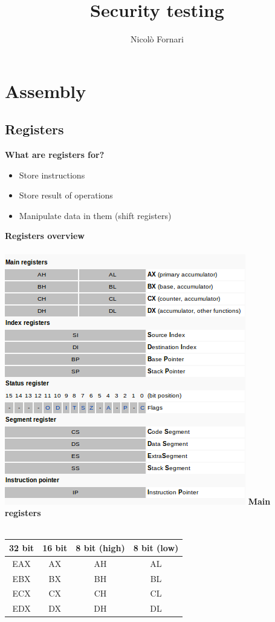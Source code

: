 \documentclass[10pt,a4paper]{book}
\author{Nicolò Fornari}
\title{Security testing}
\begin{document}
\chapter{Assembly}
\section{Registers}
\textbf{What are registers for?}
\begin{itemize}[noitemsep,nolistsep]
\item Store instructions
\item Store result of operations
\item Manipulate data in them (shift registers)
\end{itemize}
\textbf{Registers overview}\\\\
\includegraphics[scale=0.6]{registers.png}
\newpage
\textbf{Main registers}\\\\
\begin{tabular}{|c|c|c|c|}
\hline 
32 bit & 16 bit & 8 bit (high) & 8 bit (low) \\ 
\hline 
EAX & AX & AH & AL \\ 
\hline 
EBX & BX & BH & BL \\ 
\hline 
ECX & CX & CH & CL \\ 
\hline 
EDX & DX & DH & DL \\ 
\hline 
\end{tabular} 
\end{document}
